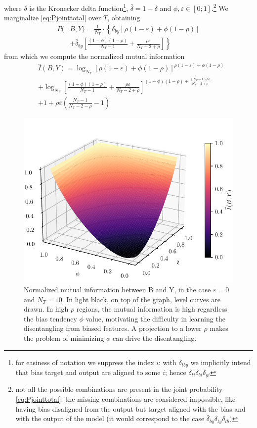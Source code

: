 where $\delta$ is the Kronecker delta function\footnote{for easiness of notation we suppress the index $i$: with $\delta_{tby}$ we implicitly intend that bias target and output are aligned to some $i$; hence $\delta_{ti}\delta_{bi}\delta_{yi}$}, $\bar{\delta}=1-\delta$ and $\phi,\varepsilon\in[0; 1]$.\footnote{not all the possible combinations are present in the joint probability \eqref{eq:Pjointtotal}: the missing combinations are  considered impossible, like having bias disaligned from the output but target aligned with the bias and with the output of the model (it would correspond to the case $\bar{\delta}_{by}\delta_{ty}\delta_{tb})$} We marginalize \eqref{eq:Pjointtotal} over $T$, obtaining
\begin{align}
	P(&B,Y) = \frac{1}{N_T} \cdot \left\{\delta_{by} [\rho (1 - \varepsilon) + \phi(1-\rho)] \right .\nonumber\\
	&\left .+ \bar{\delta}_{by}\left [\frac{(1-\phi)(1-\rho)}{N_T-1} + \frac{\rho\varepsilon}{N_T-2+\rho}\right ]\right\}
	\label{eq:joint_bz}
\end{align}
from which we compute the normalized mutual information
\begin{align}
    &\widehat{I}(B, Y) = \log_{N_T}\left[\rho (1 - \varepsilon) + \phi(1-\rho)\right]^{\rho (1 - \varepsilon)+ \phi(1-\rho)}\nonumber\\
    &+ \log_{N_T} \left [\frac{(1-\phi)(1-\rho)}{N_T-1} + \frac{\rho\varepsilon}{N_T-2+\rho}\right ]^{(1-\phi)(1-\rho) + \frac{(N_T-1)\rho\varepsilon}{N_T-2+\rho}}\nonumber\\
    &+ 1 + \rho\varepsilon \left(\frac{N_T-1}{N_T-2-\rho} -1 \right)\label{eq:MIcool}
\end{align}
\begin{figure}
    \centering
    \includegraphics[width=1.0\columnwidth,trim={0 0 0 30},clip]{img/MI_YZ_full.pdf}
    \caption{Normalized mutual information between B and Y, in the case $\varepsilon=0$ and $N_T=10$. In light black, on top of the graph, level curves are drawn. In high $\rho$ regions, the mutual information is high regardless the bias tendency $\phi$ value, motivating the difficulty in learning the disentangling from biased features. A projection to a lower $\rho$ makes the problem of minimizing $\phi$ can drive the disentangling.}
    \label{fig:MI_YZ}
\end{figure}
